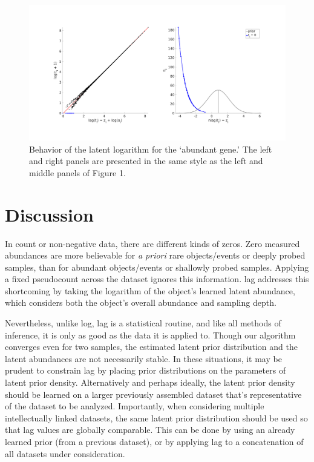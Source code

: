 \documentclass[11pt]{article}
\begin{document}
\begin{figure}[t]
\centering
\includegraphics[trim={1cm 3cm 1cm 2cm},clip,width=\textwidth]{figure3.png}
\caption{Behavior of the latent logarithm for the `abundant gene.' The left and right panels are presented in the same style as the left and middle panels of Figure 1.}
\end{figure}

\section{Discussion}

In count or non-negative data, there are different kinds of zeros. Zero measured abundances are more believable for \emph{a priori} rare objects/events or deeply probed samples, than for abundant objects/events or shallowly probed samples. Applying a fixed pseudocount across the dataset ignores this information. lag addresses this shortcoming by taking the logarithm of the object's learned latent abundance, which considers both the object's overall abundance and sampling depth.

Nevertheless, unlike log, lag is a statistical routine, and like all methods of inference, it is only as good as the data it is applied to. Though our algorithm converges even for two samples, the estimated latent prior distribution and the latent abundances are not necessarily stable. In these situations, it may be prudent to constrain lag by placing prior distributions on the parameters of latent prior density. Alternatively and perhaps ideally, the latent prior density should be learned on a larger previously assembled dataset that's representative of the dataset to be analyzed. Importantly, when considering multiple intellectually linked datasets, the same latent prior distribution should be used so that lag values are globally comparable. This can be done by using an already learned prior (from a previous dataset), or by applying lag to a concatenation of all datasets under consideration.
\end{document}
